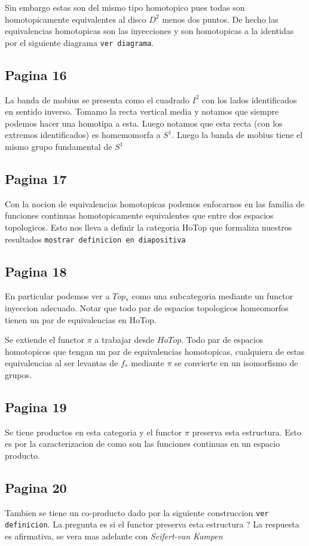 \documentclass[letterpaper]{article}
\newcommand{\vank}{\emph{Seifert-van Kampen} }
\begin{document}
Sin embargo estas son del mismo tipo homotopico pues todas son
homotopicamente equivalentes al disco \(D^2\) menos dos puntos. De hecho
las equivalencias homotopicas son las inyecciones y son homotopicas a la
identidas por el siguiente diagrama \texttt{ver diagrama}.

\subsection*{Pagina 16}
La banda de mobius se presenta como el cuadrado \(I^2\) con los lados
identificados en sentido inverso. Tomamo la recta vertical media y
notamos que siempre podemos hacer una homotipa a esta. Luego notamos que
esta recta (con los extremos identificados) es homemomorfa a \(S^1\).
Luego la banda de mobius tiene el mismo grupo fundamental de \(S^1\)

\subsection*{Pagina 17}
Con la nocion de equivalencias homotopicas podemos enfocarnos en las
familia de funciones continuas homotopicamente equivalentes que entre
dos espacios topologicos. Esto nos lleva a definir la categoria HoTop
que formaliza nuestros resultados \texttt{mostrar definicion en
  diapositiva}

\subsection*{Pagina 18}
En particular podemos ver a \(Top_*\) como una subcategoria mediante un
functor inyeccion adecuado. Notar que todo par de espacios topologicos
homeomorfos tienen un par de equivalencias en HoTop.

Se extiende el functor \(\pi\) a trabajar desde \(HoTop\). Todo par de
espacios homotopicos que tengan un par de equivalencias homotopicas,
cualquiera de estas equivalencias al ser levantas de \(f_*\) mediante
\(\pi\) se convierte en un isomorfismo de grupos.

\subsection*{Pagina 19}
Se tiene productos en esta categoria y el functor \(\pi\) preserva esta
estructura. Esto es por la caracterizacion de como son las funciones
continuas en un espacio producto.

\subsection*{Pagina 20}
Tambien se tiene un co-producto dado por la siguiente construccion
\texttt{ver definicion}. La pregunta es si el functor preserva esta
estructura ? La respuesta es afirmativa, se vera mas adelante con \vank
\end{document}
